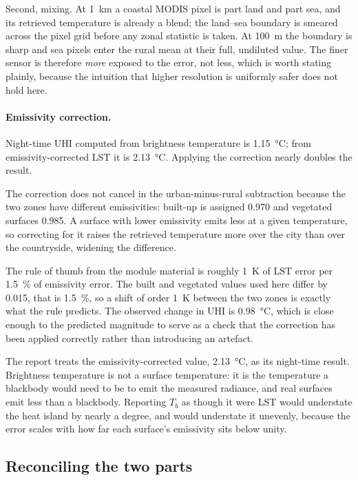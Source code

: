 \documentclass[11pt,a4paper]{article}
\begin{document}
Second, mixing. At \SI{1}{\kilo\metre} a coastal MODIS pixel is part
land and part sea, and its retrieved temperature is already a blend;
the land--sea boundary is smeared across the pixel grid before any
zonal statistic is taken. At \SI{100}{\metre} the boundary is sharp
and sea pixels enter the rural mean at their full, undiluted value. The
finer sensor is therefore \emph{more} exposed to the error, not less,
which is worth stating plainly, because the intuition that higher
resolution is uniformly safer does not hold here.

\paragraph{Emissivity correction.}
Night-time UHI computed from brightness temperature is
\SI{1.15}{\degreeCelsius}; from emissivity-corrected LST it is
\SI{2.13}{\degreeCelsius}. Applying the correction nearly doubles the
result.

The correction does not cancel in the urban-minus-rural subtraction
because the two zones have different emissivities: built-up is
assigned \num{0.970} and vegetated surfaces \num{0.985}. A surface
with lower emissivity emits less at a given temperature, so correcting
for it raises the retrieved temperature more over the city than over
the countryside, widening the difference.

The
rule of thumb from the module material is roughly \SI{1}{\kelvin} of
LST error per \SI{1.5}{\percent} of emissivity error. The built and
vegetated values used here differ by \num{0.015}, that is
\SI{1.5}{\percent}, so a shift of order \SI{1}{\kelvin} between the
two zones is exactly what the rule predicts. The observed change in
UHI is \SI{0.98}{\degreeCelsius}, which is close enough to the
predicted magnitude to serve as a check that the correction has been
applied correctly rather than introducing an artefact.

The report treats the emissivity-corrected value,
\SI{2.13}{\degreeCelsius}, as its night-time result. Brightness
temperature is not a surface temperature: it is the temperature a
blackbody would need to be to emit the measured radiance, and real
surfaces emit less than a blackbody. Reporting $T_b$ as though it were
LST would understate the heat island by nearly a degree, and would
understate it unevenly, because the error scales with how far each
surface's emissivity sits below unity.

\subsection{Reconciling the two parts}
\label{sec:zonemismatch}
\end{document}
